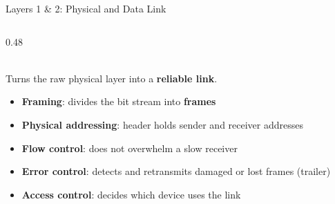 \documentclass[aspectratio=169,11pt,xcolor={table}]{beamer}
\begin{document}
\begin{frame}{Layers 1 \& 2: Physical and Data Link}
\begin{columns}[T]
\begin{column}{0.48\textwidth}
\\[1mm]
      {\small Turns the raw physical layer into a \textbf{reliable link}.}
      \begin{itemize}\scriptsize\setlength{\itemsep}{2pt}
        \item \textbf{Framing}: divides the bit stream into \textbf{frames}
        \item \textbf{Physical addressing}: header holds sender and receiver addresses
        \item \textbf{Flow control}: does not overwhelm a slow receiver
        \item \textbf{Error control}: detects and retransmits damaged or lost frames (trailer)
        \item \textbf{Access control}: decides which device uses the link
      \end{itemize}
      \centering
    \end{column}
  \end{columns}
\end{frame}
\end{document}
